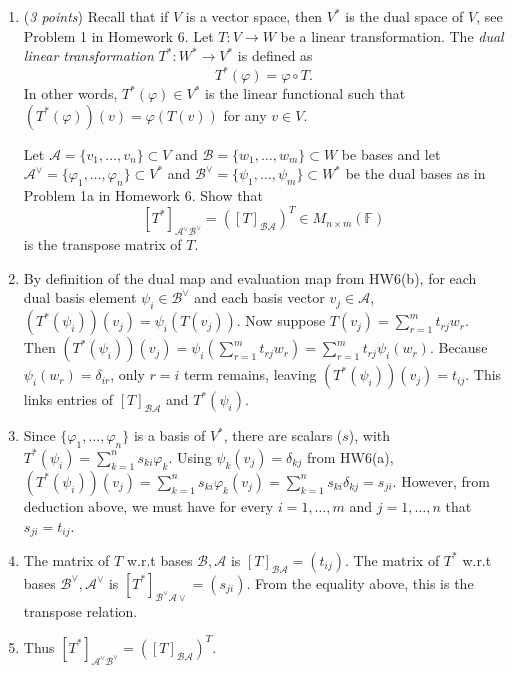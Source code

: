\documentclass[11pt]{article}
\newcommand{\bbF}{\mathbb{F}}
\renewcommand{\phi}{\varphi}
\theoremstyle{definition}
\numberwithin{equation}{subsection}
\begin{document}
\begin{enumerate}
\item (\emph{3 points}) Recall that if $V$ is a vector space, then $V^*$ is the dual space of $V$, see Problem 1 in Homework 6. Let $T\colon V \to W$ be a linear transformation. The \emph{dual linear transformation} $T^*\colon W^* \to V^*$ is defined as $$T^*(\phi)=\phi \circ T. $$
In other words, $T^*(\phi) \in V^*$ is the linear functional such that $(T^*(\phi))(v)=\phi(T(v))$ for any $v\in V$.

Let $\mathcal{A}=\{v_1,\ldots,v_n\} \subset V$ and  $\mathcal{B}=\{w_1,\ldots,w_m\} \subset W$ be bases and let $\mathcal{A}^\vee=\{\phi_1,\ldots,\phi_n\} \subset V^*$ and $\mathcal{B}^\vee=\{\psi_1,\ldots,\psi_m\} \subset W^*$ be the dual bases as in Problem 1a in Homework 6. Show that
$$[T^*]_{\mathcal{A}^\vee\mathcal{B}^\vee} =([T]_{\mathcal{B}\mathcal{A}})^T \in M_{n\times m}(\bbF)$$
is the transpose matrix of $T$.
\item[] By definition of the dual map and evaluation map from HW6(b), for each dual basis element $\psi_i\in\mathcal{B}^\vee$ and each basis vector $v_j\in\mathcal{A}$, $(T^*(\psi_i))(v_j)=\psi_i(T(v_j))$. Now suppose $T(v_j)=\sum_{r=1}^mt_{rj}w_r$. Then $(T^*(\psi_i))(v_j)=\psi_i(\sum_{r=1}^mt_{rj}w_r)=\sum_{r=1}^mt_{rj}\psi_i(w_r)$. Because $\psi_i(w_r)=\delta_{ir}$, only $r=i$ term remains, leaving $(T^*(\psi_i))(v_j)=t_{ij}$. This links entries of $[T]_{\mathcal{BA}}$ and $T^*(\psi_i)$.
\item[] Since $\{\phi_1,\ldots,\phi_n\}$ is a basis of $V^*$, there are scalars ($s$), with $T^*(\psi_i)=\sum_{k=1}^ns_{ki}\phi_k$. Using $\psi_k(v_j)=\delta_{kj}$ from HW6(a), $(T^*(\psi_i))(v_j)=\sum_{k=1}^ns_{ki} \phi_k(v_j)=\sum_{k=1}^ns_{ki}\delta_{kj}=s_{ji}$. However, from deduction above, we must have for every $i=1,\ldots,m$ and $j=1,\ldots,n$ that $s_{ji}=t_{ij}$. 
\item[] The matrix of $T$ w.r.t bases $\mathcal{B,A}$ is $[T]_{\mathcal{BA}}=(t_{ij})$. The matrix of $T^*$ w.r.t bases $\mathcal{B^\vee,A^\vee}$ is $[T^*]_{\mathcal{B^\vee A\vee}}=(s_{ji})$. From the equality above, this is the transpose relation. 
\item[] Thus $[T^*]_{\mathcal{A}^\vee\mathcal{B}^\vee} =([T]_{\mathcal{B}\mathcal{A}})^T$.
\end{enumerate}
\end{document}
